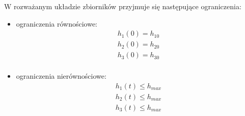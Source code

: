 W rozważanym układzie zbiorników przyjmuje się następujące ograniczenia:
\begin{itemize}
    \item ograniczenia równościowe:
    \begin{equation}\label{eq:model-eq-const}
    \begin{array}{lr}
        h_{1}(0) = h_{10}\\
        h_{2}(0) = h_{20}\\
        h_{3}(0) = h_{30}\\
    \end{array}
    \end{equation}
    \item ograniczenia nierównościowe:
    \begin{equation}\label{eq:model-noneq-const}
    \begin{array}{lr}
        h_{1}(t) \leq h_{max}\\
        h_{2}(t) \leq h_{max}\\
        h_{3}(t) \leq h_{max}\\
    \end{array}
    \end{equation}
\end{itemize}
